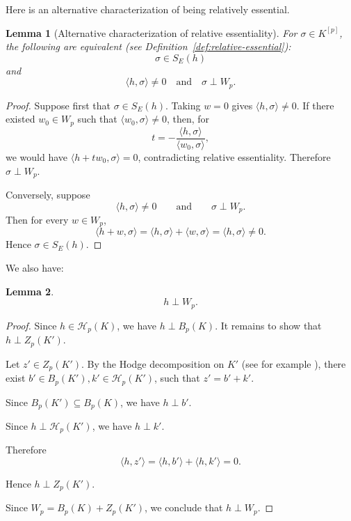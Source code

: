 \documentclass[11pt]{amsart}
\theoremstyle{theorem}
\newtheorem{lemma}{Lemma}[section]
\theoremstyle{remark}
\theoremstyle{definition}
\newcommand{\Harm}{\mathcal{H}}
\begin{document}
Here is an alternative characterization of being relatively essential. 
\begin{lemma}[Alternative characterization of relative essentiality]
\label{lem:linear}
For \(\sigma \in K^{[p]}\), the following are equivalent (see Definition~\ref{def:relative-essential}):
\[
\sigma\in S_E(h)
\]
and
\[
\langle h,\sigma\rangle\neq 0
\quad\text{and}\quad
\sigma\perp W_p.
\]
\end{lemma}

\begin{proof}
Suppose first that \(\sigma\in S_E(h)\). Taking \(w=0\) gives
$
\langle h,\sigma\rangle\neq 0
$.
If there existed \(w_0\in W_p\) such that
$
\langle w_0,\sigma\rangle\neq 0
$,
then, for
\[
t=-\frac{\langle h,\sigma\rangle}{\langle w_0,\sigma\rangle},
\]
we would have
$
\langle h+t w_0,\sigma\rangle=0
$,
contradicting relative essentiality. Therefore \(\sigma\perp W_p\).

Conversely, suppose
\[
\langle h,\sigma\rangle\neq 0
\qquad\text{and}\qquad
\sigma\perp W_p.
\]
Then for every \(w\in W_p\),
\[
\langle h+w,\sigma\rangle
=
\langle h,\sigma\rangle+\langle w,\sigma\rangle
=
\langle h,\sigma\rangle
\neq 0.
\]
Hence \(\sigma\in S_E(h)\).
\end{proof}


We also have:
\begin{lemma}
\label{lem:orthogonality}
\[
h\perp W_p.
\]
\end{lemma}

\begin{proof}
Since
$
h\in\Harm_p(K)
$,
we have
$
h\perp B_p(K)
$.
It remains to show that
$
h\perp Z_p(K')
$.

Let
$
z'\in Z_p(K')
$.
By the Hodge decomposition on \(K'\) (see for example \cite{Lim2020}), there exist
$
b'\in B_p(K'),
k'\in\Harm_p(K')
$,
such that
$
z'=b'+k'
$.

Since
$
B_p(K')\subseteq B_p(K)
$,
we have
$
h\perp b'
$.

Since
$
h\perp \Harm_p(K')
$,
we have
$
h\perp k'
$.

Therefore
\[
\langle h,z'\rangle
=
\langle h,b'\rangle+\langle h,k'\rangle
=
0.
\]

Hence
$
h\perp Z_p(K')
$.

Since
$
W_p=B_p(K)+Z_p(K')
$,
we conclude that
$
h\perp W_p
$.
\end{proof}
\end{document}
